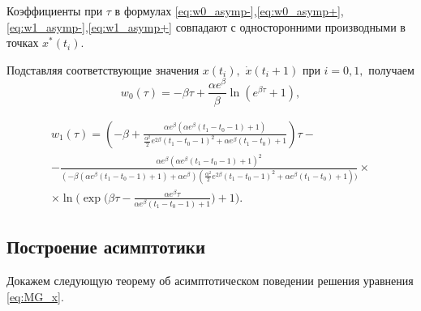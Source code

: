 \begin{remark}
	Коэффициенты при $\tau$ в формулах \eqref{eq:w0_asymp-},\eqref{eq:w0_asymp+},\eqref{eq:w1_asymp-},\eqref{eq:w1_asymp+} совпадают с односторонними производными в точках $x^*(t_i)$. 
\end{remark}

Подставляя соответствующие значения $x(t_i),$ $\dot{x}(t_i + 1)$ при $i = 0, 1,$ получаем
\begin{equation}
	\label{eq:w0}
	w_0(\tau)=-\beta \tau+\frac{\alpha e^\beta}{\beta}\ln(e^{\beta\tau}+1),
\end{equation}

\begin{multline}
	\label{eq:w1}
	w_1(\tau)=\left(-\beta + \frac{\alpha e^\beta(\alpha e^\beta(t_1-t_0-1)+1)}{\frac{\alpha^2}{2}e^{2\beta}(t_1-t_0-1)^2+\alpha e^{\beta}(t_1-t_0) + 1}\right)\tau -\\- \frac{\alpha e^\beta(\alpha e^\beta(t_1-t_0-1)+1)^2}{(-\beta(\alpha e^\beta(t_1-t_0-1)+1)+\alpha e^\beta)(\frac{\alpha^2}{2}e^{2\beta}(t_1-t_0-1)^2+\alpha e^{\beta}(t_1-t_0)+1))}\times
	\\ \times\ln\Bigg(\exp\Big(\beta\tau-\frac{\alpha e^\beta\tau}{\alpha e^\beta(t_1-t_0-1)+1}\Big)+1\Bigg).
\end{multline}

\subsection{Построение асимптотики}

Докажем следующую теорему об асимптотическом поведении решения уравнения \eqref{eq:MG_x}.

